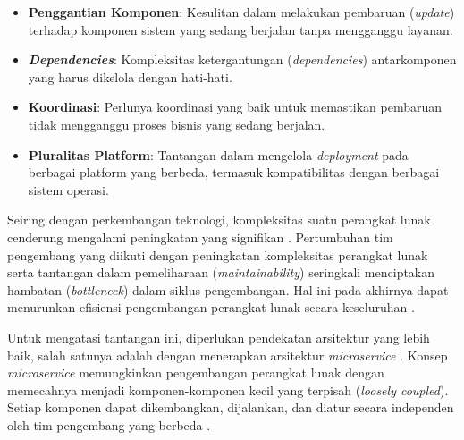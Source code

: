 \begin{itemize}
    \item \textbf{Penggantian Komponen}: Kesulitan dalam melakukan pembaruan (\textit{update}) terhadap komponen sistem yang sedang berjalan tanpa mengganggu layanan.

    \item \textit{\textbf{Dependencies}}: Kompleksitas ketergantungan (\textit{dependencies}) antarkomponen yang harus dikelola dengan hati-hati.

    \item \textbf{Koordinasi}: Perlunya koordinasi yang baik untuk memastikan pembaruan tidak mengganggu proses bisnis yang sedang berjalan.

    \item \textbf{Pluralitas Platform}: Tantangan dalam mengelola \textit{deployment} pada berbagai platform yang berbeda, termasuk kompatibilitas dengan berbagai sistem operasi.
\end{itemize}
\par
Seiring dengan perkembangan teknologi, kompleksitas suatu perangkat lunak cenderung mengalami peningkatan yang signifikan \cite{Tania2014, Newman2015}. Pertumbuhan tim pengembang yang diikuti dengan peningkatan kompleksitas perangkat lunak serta tantangan dalam pemeliharaan (\textit{maintainability}) seringkali menciptakan hambatan (\textit{bottleneck}) dalam siklus pengembangan. Hal ini pada akhirnya dapat menurunkan efisiensi pengembangan perangkat lunak secara keseluruhan \cite{Yale2016}.

Untuk mengatasi tantangan ini, diperlukan pendekatan arsitektur yang lebih baik, salah satunya adalah dengan menerapkan arsitektur \textit{microservice} \cite{Tania2014}. Konsep \textit{microservice} memungkinkan pengembangan perangkat lunak dengan memecahnya menjadi komponen-komponen kecil yang terpisah (\textit{loosely coupled}). Setiap komponen dapat dikembangkan, dijalankan, dan diatur secara independen oleh tim pengembang yang berbeda \cite{Xiao2017}.

